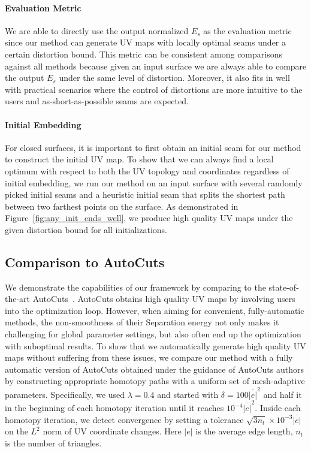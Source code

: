 \paragraph{Evaluation Metric}
We are able to directly use the output normalized $E_{s}$ as the evaluation metric since our method can generate UV maps with locally optimal seams under a certain distortion bound. This metric can be consistent among comparisons against all methods because given an input surface we are always able to compare the output $E_{s}$ under the same level of distortion. Moreover, it also fits in well with practical scenarios where the control of distortions are more intuitive to the users and as-short-as-possible seams are expected.

\paragraph{Initial Embedding}
\minchen{[TODO?]}
For closed surfaces, it is important to first obtain an initial seam for our method to construct the initial UV map. To show that we can always find a local optimum with respect to both the UV topology and coordinates regardless of initial embedding, we run our method on an input surface with several randomly picked initial seams and a heuristic initial seam that splits the shortest path between two farthest points on the surface. As demonstrated in Figure~\ref{fig:any_init_ends_well}, we produce high quality UV maps under the given distortion bound for all initializations.

\subsection{Comparison to AutoCuts}

We demonstrate the capabilities of our framework by comparing to the state-of-the-art AutoCuts~\cite{Poranne2017Autocuts}.
AutoCuts obtains high quality UV maps by involving users into the optimization loop. However, when aiming for convenient, fully-automatic methods, the non-smoothness of their Separation energy not only makes it challenging for global parameter settings, but also often end up the optimization with suboptimal results. To show that we automatically generate high quality UV maps without suffering from these issues, we compare our method with a fully automatic version of AutoCuts obtained under the guidance of AutoCuts authors by constructing appropriate homotopy paths with a uniform set of mesh-adaptive parameters. 
Specifically, we used $\lambda = 0.4$ and started with $\delta=100\overline{|e|}^2$ and half it in the beginning of each homotopy iteration until it reaches $10^{-4}\overline{|e|}^2$. Inside each homotopy iteration, we detect convergence by setting a tolerance $\sqrt{3n_t}\times10^{-3}\overline{|e|}$ on the $L^2$ norm of UV coordinate changes. Here $\overline{|e|}$ is the average edge length, $n_t$ is the number of triangles.

